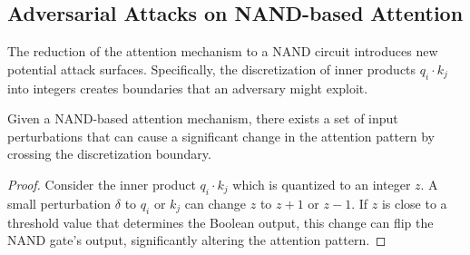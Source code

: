 \subsection{Adversarial Attacks on NAND-based Attention}






The reduction of the attention mechanism to a NAND circuit introduces new potential attack surfaces. Specifically, the discretization of inner products \( q_i \cdot k_j \) into integers creates boundaries that an adversary might exploit. 













\begin{theorem}






Given a NAND-based attention mechanism, there exists a set of input perturbations that can cause a significant change in the attention pattern by crossing the discretization boundary.






\end{theorem}













\begin{proof}






Consider the inner product \( q_i \cdot k_j \) which is quantized to an integer \( z \). A small perturbation \( \delta \) to \( q_i \) or \( k_j \) can change \( z \) to \( z+1 \) or \( z-1 \). If \( z \) is close to a threshold value that determines the Boolean output, this change can flip the NAND gate’s output, significantly altering the attention pattern.






\end{proof}













